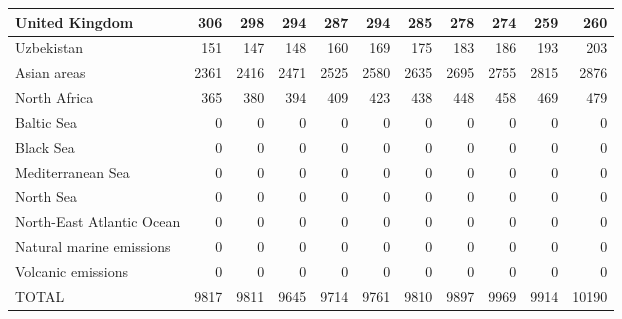 \begin{table}
\begin{tabular}{|l|r|r|r|r|r|r|r|r|r|r|}
                United Kingdom&    306&    298&    294&    287&    294&    285&    278&    274&    259&    260\\\hline
                    Uzbekistan&    151&    147&    148&    160&    169&    175&    183&    186&    193&    203\\\hline
                   Asian areas&   2361&   2416&   2471&   2525&   2580&   2635&   2695&   2755&   2815&   2876\\\hline
                  North Africa&    365&    380&    394&    409&    423&    438&    448&    458&    469&    479\\\hline
                    Baltic Sea&      0&      0&      0&      0&      0&      0&      0&      0&      0&      0\\\hline
                     Black Sea&      0&      0&      0&      0&      0&      0&      0&      0&      0&      0\\\hline
             Mediterranean Sea&      0&      0&      0&      0&      0&      0&      0&      0&      0&      0\\\hline
                     North Sea&      0&      0&      0&      0&      0&      0&      0&      0&      0&      0\\\hline
     North-East Atlantic Ocean&      0&      0&      0&      0&      0&      0&      0&      0&      0&      0\\\hline
      Natural marine emissions&      0&      0&      0&      0&      0&      0&      0&      0&      0&      0\\\hline
            Volcanic emissions&      0&      0&      0&      0&      0&      0&      0&      0&      0&      0\\\hline\hline
                         TOTAL&   9817&   9811&   9645&   9714&   9761&   9810&   9897&   9969&   9914&  10190\\\hline
 \end{tabular}
 \end{table}
 
